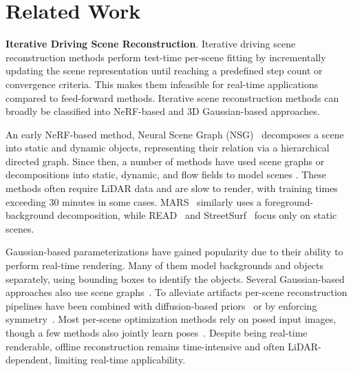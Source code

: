 \section{Related Work}
\label{sec:background}

\textbf{Iterative Driving Scene Reconstruction}. Iterative driving scene reconstruction methods perform test-time per-scene fitting by incrementally updating the scene representation until reaching a predefined step count or convergence criteria. This makes them infeasible for real-time applications compared to feed-forward methods. Iterative scene reconstruction methods can broadly be classified into NeRF-based and 3D Gaussian-based approaches. 

An early NeRF-based method, Neural Scene Graph (NSG)~\cite{NSG_2021_CVPR} decomposes a scene into static and dynamic objects, representing their relation via a hierarchical directed graph. Since then, a number of methods have used scene graphs or decompositions into static, dynamic, and flow fields to model scenes \cite{ml_nsg_2024_CVPR, NeuRAD_Tonderski_2024_CVPR, turki2023suds, yang2023emernerf}. These methods often require LiDAR data and are slow to render, with training times exceeding 30 minutes in some cases. MARS~\cite{wu2023mars} similarly uses a foreground-background decomposition, while READ~\cite{li2022read} and StreetSurf~\cite{guo2023streetsurf} focus only on static scenes.

Gaussian-based parameterizations have gained popularity due to their ability to perform real-time rendering. Many of them model backgrounds and objects separately, using bounding boxes to identify the objects. Several Gaussian-based approaches also use scene graphs~\cite{Hugs_Zhou_2024_CVPR, yan2024street, chen2024omnire, zhou2024drivinggaussian}. To alleviate artifacts per-scene reconstruction pipelines have been combined with diffusion-based priors~\cite{VEGS, Yu2024SGDSV} or by enforcing symmetry~\cite{khan2024autosplatconstrainedgaussiansplatting}. Most per-scene optimization methods rely on posed input images, though a few methods also jointly learn poses~\cite{chen2023periodic, li2024_VDG}. Despite being real-time renderable, offline reconstruction remains time-intensive and often LiDAR-dependent, limiting real-time applicability. \\

